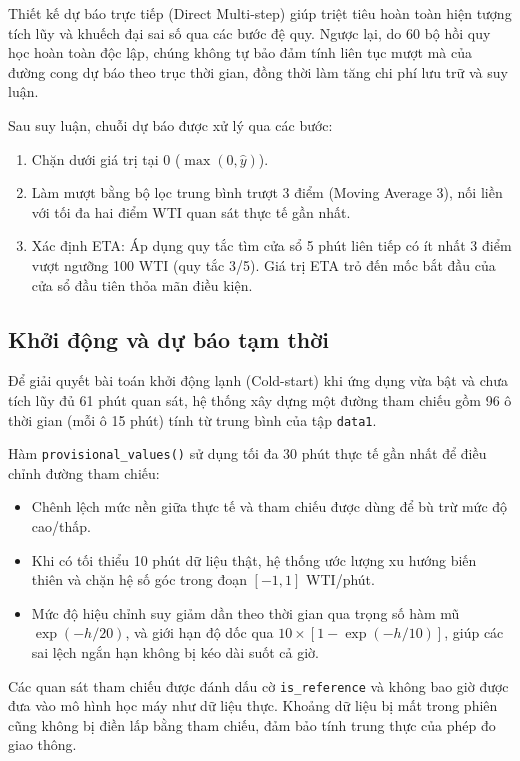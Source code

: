     Thiết kế dự báo trực tiếp (Direct Multi-step) giúp triệt tiêu hoàn toàn hiện tượng tích lũy và khuếch đại sai số qua các bước đệ quy. Ngược lại, do 60 bộ hồi quy học hoàn toàn độc lập, chúng không tự bảo đảm tính liên tục mượt mà của đường cong dự báo theo trục thời gian, đồng thời làm tăng chi phí lưu trữ và suy luận.

    Sau suy luận, chuỗi dự báo được xử lý qua các bước:
    \begin{enumerate}
        \item Chặn dưới giá trị tại 0 ($\max(0, \hat{y})$).
        \item Làm mượt bằng bộ lọc trung bình trượt 3 điểm (Moving Average 3), nối liền với tối đa hai điểm WTI quan sát thực tế gần nhất.
        \item Xác định ETA: Áp dụng quy tắc tìm cửa sổ 5 phút liên tiếp có ít nhất 3 điểm vượt ngưỡng 100 WTI (quy tắc 3/5). Giá trị ETA trỏ đến mốc bắt đầu của cửa sổ đầu tiên thỏa mãn điều kiện.
    \end{enumerate}

    

    \subsection{Khởi động và dự báo tạm thời}
    Để giải quyết bài toán khởi động lạnh (Cold-start) khi ứng dụng vừa bật và chưa tích lũy đủ 61 phút quan sát, hệ thống xây dựng một đường tham chiếu gồm 96 ô thời gian (mỗi ô 15 phút) tính từ trung bình của tập \texttt{data1}.

    Hàm \texttt{provisional\_values()} sử dụng tối đa 30 phút thực tế gần nhất để điều chỉnh đường tham chiếu:
    \begin{itemize}
        \item Chênh lệch mức nền giữa thực tế và tham chiếu được dùng để bù trừ mức độ cao/thấp.
        \item Khi có tối thiểu 10 phút dữ liệu thật, hệ thống ước lượng xu hướng biến thiên và chặn hệ số góc trong đoạn $[-1, 1]$ WTI/phút.
        \item Mức độ hiệu chỉnh suy giảm dần theo thời gian qua trọng số hàm mũ $\exp(-h/20)$, và giới hạn độ dốc qua $10 \times [1 - \exp(-h/10)]$, giúp các sai lệch ngắn hạn không bị kéo dài suốt cả giờ.
    \end{itemize}

    Các quan sát tham chiếu được đánh dấu cờ \texttt{is\_reference} và không bao giờ được đưa vào mô hình học máy như dữ liệu thực. Khoảng dữ liệu bị mất trong phiên cũng không bị điền lấp bằng tham chiếu, đảm bảo tính trung thực của phép đo giao thông.


